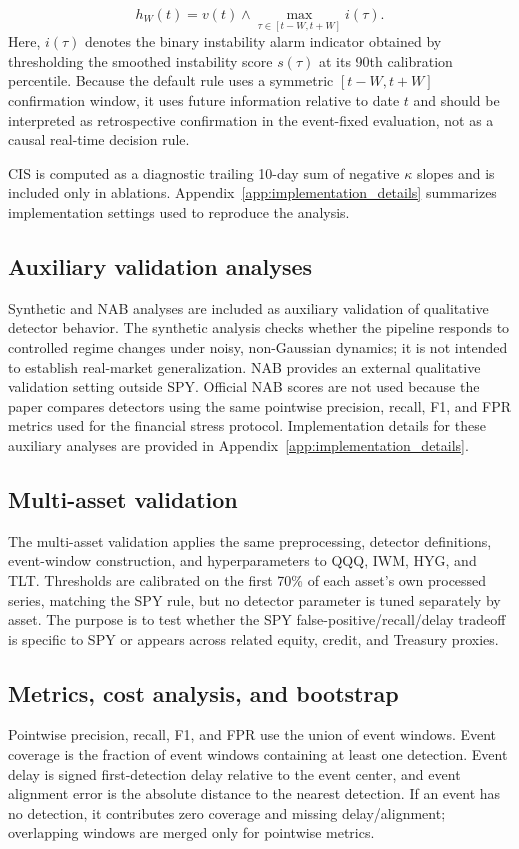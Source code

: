 \documentclass[pdflatex,sn-mathphys-num]{sn-jnl}
\begin{document}
\begin{itemize}
\begin{equation}
h_W(t)=v(t)\wedge \max_{\tau\in[t-W,t+W]}i(\tau).
\end{equation}
Here, $i(\tau)$ denotes the binary instability alarm indicator obtained by thresholding the smoothed instability score $s(\tau)$ at its 90th calibration percentile. Because the default rule uses a symmetric $[t-W,t+W]$ confirmation window, it uses future information relative to date $t$ and should be interpreted as retrospective confirmation in the event-fixed evaluation, not as a causal real-time decision rule.
\end{itemize}
CIS is computed as a diagnostic trailing 10-day sum of negative $\kappa$ slopes and is included only in ablations. Appendix~\ref{app:implementation_details} summarizes implementation settings used to reproduce the analysis.

\subsection{Auxiliary validation analyses}
Synthetic and NAB analyses are included as auxiliary validation of qualitative detector behavior. The synthetic analysis checks whether the pipeline responds to controlled regime changes under noisy, non-Gaussian dynamics; it is not intended to establish real-market generalization. NAB provides an external qualitative validation setting outside SPY. Official NAB scores are not used because the paper compares detectors using the same pointwise precision, recall, F1, and FPR metrics used for the financial stress protocol. Implementation details for these auxiliary analyses are provided in Appendix~\ref{app:implementation_details}.

\subsection{Multi-asset validation}
The multi-asset validation applies the same preprocessing, detector definitions, event-window construction, and hyperparameters to QQQ, IWM, HYG, and TLT. Thresholds are calibrated on the first 70\% of each asset's own processed series, matching the SPY rule, but no detector parameter is tuned separately by asset. The purpose is to test whether the SPY false-positive/recall/delay tradeoff is specific to SPY or appears across related equity, credit, and Treasury proxies.

\subsection{Metrics, cost analysis, and bootstrap}
Pointwise precision, recall, F1, and FPR use the union of event windows. Event coverage is the fraction of event windows containing at least one detection. Event delay is signed first-detection delay relative to the event center, and event alignment error is the absolute distance to the nearest detection. If an event has no detection, it contributes zero coverage and missing delay/alignment; overlapping windows are merged only for pointwise metrics.
\end{document}
